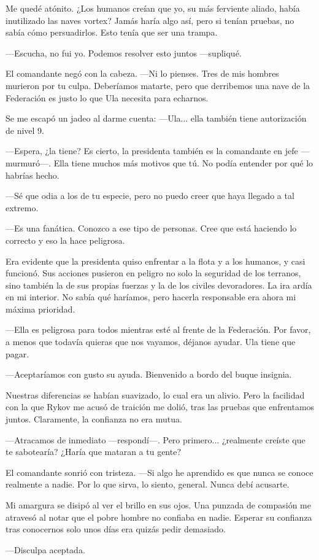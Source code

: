 Me quedé atónito. ¿Los humanos creían que yo, su más ferviente aliado, había inutilizado las naves vortex? Jamás haría algo así, pero si tenían pruebas, no sabía cómo persuadirlos. Esto tenía que ser una trampa.

—Escucha, no fui yo. Podemos resolver esto juntos —supliqué.

El comandante negó con la cabeza. —Ni lo pienses. Tres de mis hombres murieron por tu culpa. Deberíamos matarte, pero que derribemos una nave de la Federación es justo lo que Ula necesita para echarnos.

Se me escapó un jadeo al darme cuenta: —Ula... ella también tiene autorización de nivel 9.

—Espera, ¿la tiene? Es cierto, la presidenta también es la comandante en jefe —murmuró—. Ella tiene muchos más motivos que tú. No podía entender por qué lo habrías hecho.

—Sé que odia a los de tu especie, pero no puedo creer que haya llegado a tal extremo.

—Es una fanática. Conozco a ese tipo de personas. Cree que está haciendo lo correcto y eso la hace peligrosa.

Era evidente que la presidenta quiso enfrentar a la flota y a los humanos, y casi funcionó. Sus acciones pusieron en peligro no solo la seguridad de los terranos, sino también la de sus propias fuerzas y la de los civiles devoradores. La ira ardía en mi interior. No sabía qué haríamos, pero hacerla responsable era ahora mi máxima prioridad.

—Ella es peligrosa para todos mientras esté al frente de la Federación. Por favor, a menos que todavía quieras que nos vayamos, déjanos ayudar. Ula tiene que pagar.

—Aceptaríamos con gusto su ayuda. Bienvenido a bordo del buque insignia.

Nuestras diferencias se habían suavizado, lo cual era un alivio. Pero la facilidad con la que Rykov me acusó de traición me dolió, tras las pruebas que enfrentamos juntos. Claramente, la confianza no era mutua.

—Atracamos de inmediato —respondí—. Pero primero... ¿realmente creíste que te sabotearía? ¿Haría que mataran a tu gente?

El comandante sonrió con tristeza. —Si algo he aprendido es que nunca se conoce realmente a nadie. Por lo que sirva, lo siento, general. Nunca debí acusarte.

Mi amargura se disipó al ver el brillo en sus ojos. Una punzada de compasión me atravesó al notar que el pobre hombre no confiaba en nadie. Esperar su confianza tras conocernos solo unos días era quizás pedir demasiado.

—Disculpa aceptada.
